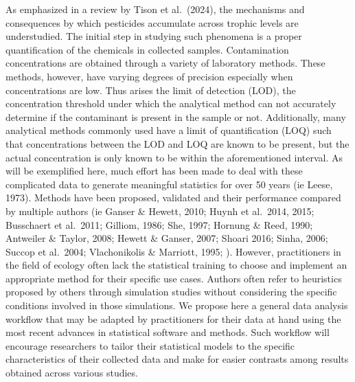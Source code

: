 \documentclass[
]{article}
\begin{document}
As emphasized in a review by Tison et al.~(2024), the mechanisms and
consequences by which pesticides accumulate across trophic levels are
understudied. The initial step in studying such phenomena is a proper
quantification of the chemicals in collected samples. Contamination
concentrations are obtained through a variety of laboratory methods.
These methods, however, have varying degrees of precision especially
when concentrations are low. Thus arises the limit of detection (LOD),
the concentration threshold under which the analytical method can not
accurately determine if the contaminant is present in the sample or not.
Additionally, many analytical methods commonly used have a limit of
quantification (LOQ) such that concentrations between the LOD and LOQ
are known to be present, but the actual concentration is only known to
be within the aforementioned interval. As will be exemplified here, much
effort has been made to deal with these complicated data to generate
meaningful statistics for over 50 years (ie Leese, 1973). Methods have
been proposed, validated and their performance compared by multiple
authors (ie Ganser \& Hewett, 2010; Huynh et al.~2014, 2015; Busschaert
et al.~2011; Gilliom, 1986; She, 1997; Hornung \& Reed, 1990; Antweiler
\& Taylor, 2008; Hewett \& Ganser, 2007; Shoari 2016; Sinha, 2006;
Succop et al.~2004; Vlachonikolis \& Marriott, 1995; ). However,
practitioners in the field of ecology often lack the statistical
training to choose and implement an appropriate method for their
specific use cases. Authors often refer to heuristics proposed by others
through simulation studies without considering the specific conditions
involved in those simulations. We propose here a general data analysis
workflow that may be adapted by practitioners for their data at hand
using the most recent advances in statistical software and methods. Such
workflow will encourage researchers to tailor their statistical models
to the specific characteristics of their collected data and make for
easier contrasts among results obtained across various studies.
\end{document}
